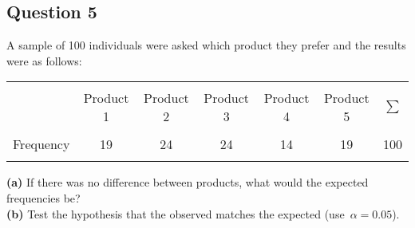 

\subsection*{Question 5}
A sample of 100 individuals were asked which product they prefer and the results were as follows:  \\[-0.2cm]
\begin{center}
\begin{tabular}{|c|ccccc|c|}
\hline
&&&&&&\\[-0.3cm]
 & Product 1 & Product 2 & Product 3 & Product 4 & Product 5 & $\sum$ \\[0.1cm]
\hline
&&&&&&\\[-0.3cm]
Frequency & 19 & 24 & 24 & 14 & 19 & 100\\[0.1cm]
\hline
\multicolumn{7}{c}{}\\[-0.3cm]
\end{tabular}
\end{center}

{\bf(a)} If there was no difference between products, what would the expected frequencies be? \quad \\{\bf(b)} Test the hypothesis that the observed matches the expected \mbox{(use $\alpha=0.05$)}.




 